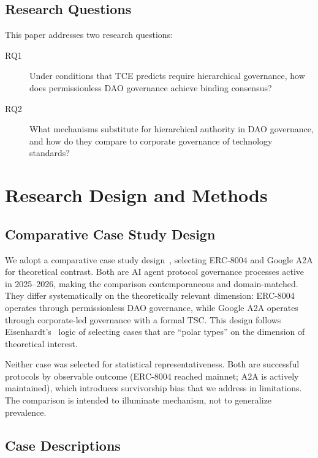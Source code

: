 \documentclass[conference]{IEEEtran}
\begin{document}
\subsection{Research Questions}

This paper addresses two research questions:

\begin{description}
  \item[RQ1] Under conditions that TCE predicts require hierarchical governance,
             how does permissionless DAO governance achieve binding consensus?
  \item[RQ2] What mechanisms substitute for hierarchical authority in DAO
             governance, and how do they compare to corporate governance of
             technology standards?
\end{description}


\section{Research Design and Methods}

\subsection{Comparative Case Study Design}

We adopt a comparative case study design~\cite{eisenhardt1989, yin2018},
selecting ERC-8004 and Google A2A for theoretical contrast. Both are AI agent
protocol governance processes active in 2025--2026, making the comparison
contemporaneous and domain-matched. They differ systematically on the
theoretically relevant dimension: ERC-8004 operates through permissionless
DAO governance, while Google A2A operates through corporate-led governance
with a formal TSC. This design follows Eisenhardt's~\cite{eisenhardt1989}
logic of selecting cases that are ``polar types'' on the dimension of
theoretical interest.

Neither case was selected for statistical representativeness. Both are
successful protocols by observable outcome (ERC-8004 reached mainnet; A2A
is actively maintained), which introduces survivorship bias that we address
in limitations. The comparison is intended to illuminate mechanism, not to
generalize prevalence.

\subsection{Case Descriptions}
\end{document}
